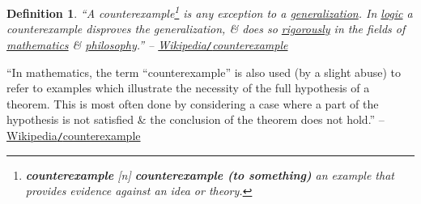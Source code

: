\documentclass{article}
\numberwithin{equation}{section}
\newtheorem{definition}{Definition}[section]
\begin{document}
\begin{definition}
	``A \emph{counterexample}\footnote{\textbf{counterexample}  [n] \textbf{counterexample (to something)} an example that provides evidence against an idea or theory.} is any exception to a \href{https://en.wikipedia.org/wiki/Generalization}{generalization}. In \href{https://en.wikipedia.org/wiki/Logic}{logic} a counterexample disproves the generalization, \& does so \href{https://en.wikipedia.org/wiki/Rigor}{rigorously} in the fields of \href{https://en.wikipedia.org/wiki/Mathematics}{mathematics} \& \href{https://en.wikipedia.org/wiki/Philosophy}{philosophy}.'' -- \href{https://en.wikipedia.org/wiki/Counterexample}{Wikipedia\emph{\texttt{/}}counterexample}
\end{definition}
``In mathematics, the term ``counterexample'' is also used (by a slight abuse) to refer to examples which illustrate the necessity of the full hypothesis of a theorem. This is most often done by considering a case where a part of the hypothesis is not satisfied \& the conclusion of the theorem does not hold.'' -- \href{https://en.wikipedia.org/wiki/Counterexample}{Wikipedia\texttt{/}counterexample}



\printbibliography[heading=bibintoc]
	
\end{document}
